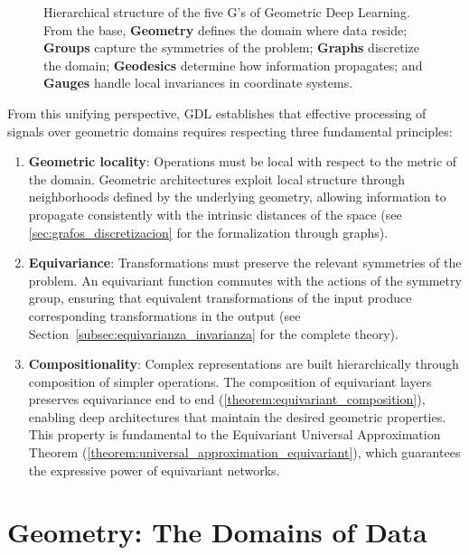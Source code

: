\begin{figure}[htbp]
\begin{tikzpicture}[scale=0.75]
\end{tikzpicture}
\caption[Hierarchy of the five G's of GDL]{Hierarchical structure of the five G's of Geometric Deep Learning. From the base, \textbf{Geometry} defines the domain where data reside; \textbf{Groups} capture the symmetries of the problem; \textbf{Graphs} discretize the domain; \textbf{Geodesics} determine how information propagates; and \textbf{Gauges} handle local invariances in coordinate systems.}
\label{fig:jerarquia_5gs}
\end{figure}

From this unifying perspective, \gls{GDL} establishes that effective processing of signals over geometric domains requires respecting three fundamental principles:

\begin{enumerate}
    \item \textbf{Geometric locality}: Operations must be local with respect to the metric of the domain. Geometric architectures exploit local structure through neighborhoods defined by the underlying geometry, allowing information to propagate consistently with the intrinsic distances of the space (see \autoref{sec:grafos_discretizacion} for the formalization through graphs).

    \item \textbf{Equivariance}: Transformations must preserve the relevant symmetries of the problem. An equivariant function commutes with the actions of the symmetry group, ensuring that equivalent transformations of the input produce corresponding transformations in the output (see Section~\ref{subsec:equivarianza_invarianza} for the complete theory).

    \item \textbf{Compositionality}: Complex representations are built hierarchically through composition of simpler operations. The composition of equivariant layers preserves equivariance end to end (\autoref{theorem:equivariant_composition}), enabling deep architectures that maintain the desired geometric properties. This property is fundamental to the Equivariant Universal Approximation Theorem (\autoref{theorem:universal_approximation_equivariant}), which guarantees the expressive power of equivariant networks.
\end{enumerate}

\section{Geometry: The Domains of Data}\label{sec:geometria_dominios}

